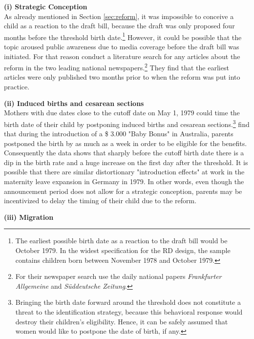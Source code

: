\documentclass[11pt, a4paper]{article} %
\begin{document}
\bigskip
\textbf{(i) Strategic Conception}\\ As already mentioned in Section \ref{sec:reform}, it was impossible to conceive a child as a reaction to the draft bill, because the draft was only proposed four months before the threshold birth date.\footnote{The earliest possible birth date as a reaction to the draft bill would be October 1979. In the widest specification for the RD design, the sample contains children born between November 1978 and October 1979.} However, it could be possible that the topic aroused public awareness due to media coverage before the draft bill was initiated. For that reason \cite{dustmann2012expansions} conduct a literature search for any articles about the reform in the two leading national newspapers.\footnote{For their newspaper search \cite{dustmann2012expansions} use the daily national papers \emph{Frankfurter Allgemeine} and \emph{Süddeutsche Zeitung}.} They find that the earliest articles were only published two months prior to when the reform was put into practice.

\bigskip
\textbf{(ii) Induced births and cesarean sections}\\ Mothers with due dates close to the cutoff date on May 1, 1979 could time the birth date of their child by postponing induced births and cesarean sections.\footnote{Bringing the birth date forward around the threshold does not constitute a threat to the identification strategy, because this behavioral response would destroy their children's eligibility. Hence, it can be safely assumed that women would like to postpone the date of birth, if any.} \cite{gans2009born} find that during the introduction of a \$ 3.000 "Baby Bonus" in Australia, parents postponed the birth by as much as a week in order to be eligible for the benefits. Consequently the data shows that sharply before the cutoff birth date there is a dip in the birth rate and a huge increase on the first day after the threshold.\newline
It is possible that there are similar distortionary "introduction effects" at work in the maternity leave expansion in Germany in 1979. In other words, even though the announcement period does not allow for a strategic conception, parents may be incentivized to delay the timing of their child due to the reform. 

\bigskip
\textbf{(iii) Migration}
\end{document}
